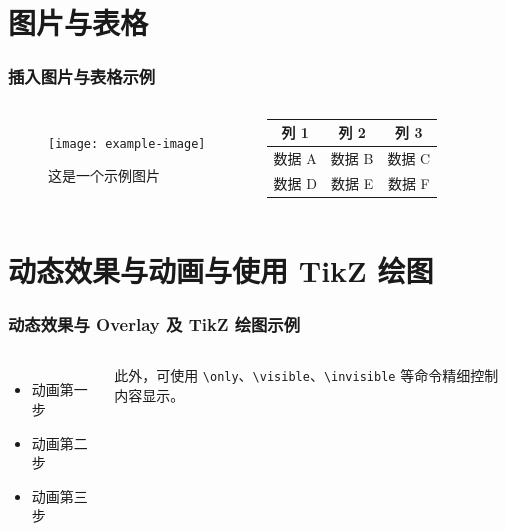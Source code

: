 \documentclass[10pt,aspectratio=169,mathserif]{beamer}
\begin{document}
\section{图片与表格}
\begin{frame}
    \frametitle{插入图片与表格示例}
    \begin{columns}[T] %
            \begin{figure}
                \centering
                \texttt{[image: example-image]} %
                \caption{这是一个示例图片}
            \end{figure}
            \begin{center}
            \begin{tabular}{|c|c|c|}
                \hline
                列 1 & 列 2 & 列 3 \\
                \hline
                数据 A & 数据 B & 数据 C \\
                \hline
                数据 D & 数据 E & 数据 F \\
                \hline
            \end{tabular}
            \end{center}
    \end{columns}
\end{frame}

\section{动态效果与动画与使用 TikZ 绘图}
\begin{frame}[fragile]
    \frametitle{动态效果与 Overlay 及 TikZ 绘图示例}
    \begin{columns}[T] %
        \begin{itemize}
            \item 动画第一步
            \item 动画第二步
            \item 动画第三步
        \end{itemize}
        此外，可使用 \verb|\only|、\verb|\visible|、\verb|\invisible| 等命令精细控制内容显示。
        
    \end{columns}
\end{frame}
\end{document}
